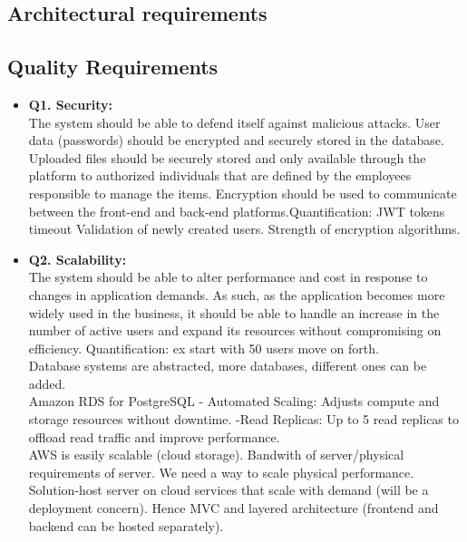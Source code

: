 \documentclass[hidelinks, 12pt, a4paper]{article}
\begin{document}
\begin{itemize}
    \pagebreak
    \section{Architectural requirements}
    \subsection{Quality Requirements}
    \begin{itemize}
        \item \textbf{Q1. Security: }\\
        The system should be able to defend itself against malicious attacks. User data (passwords) should be encrypted and securely stored in the database.  Uploaded files should be securely stored and only available through the platform to authorized individuals that are defined by the employees responsible to manage the items. Encryption should be used to communicate between the front-end and back-end platforms.Quantification: JWT tokens timeout Validation of newly created users.
        Strength of encryption algorithms.\\

        \item \textbf{Q2. Scalability: }\\
        The system should be able to alter performance and cost in response to changes in application demands. As such, as the application becomes more widely used in the business, it should be able to handle an increase in the number of active users and expand its resources without compromising on efficiency.
        Quantification: ex start with 50 users move on forth.\\
        Database systems are abstracted, more databases, different ones can be added.\\
        Amazon RDS for PostgreSQL - Automated Scaling: Adjusts compute and storage resources without downtime.
        -Read Replicas: Up to 5 read replicas to offload read traffic and improve performance.\\
        AWS is easily scalable (cloud storage).
        Bandwith of server/physical requirements of server. We need a way to scale physical performance.\\
        Solution-host server on cloud services that scale with demand (will be a deployment concern). Hence MVC and layered architecture (frontend and backend can be hosted separately).\\


\end{itemize}
\end{itemize}
\end{document}
